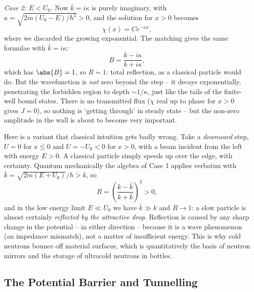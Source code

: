 \emph{Case 2: $E < U_0$.} Now $\bar{k} = i \kappa$ is purely imaginary, with $\kappa = \sqrt{2m(U_0 - E)/\hbar^2} > 0$, and the solution for $x > 0$ becomes
$$
\chi(x) = C e^{-\kappa x},
$$
where we discarded the growing exponential. The matching gives the same formulae with $\bar k = i\kappa$:
$$
B = \frac{k - i \kappa}{k + i \kappa},
$$
which has $\abs{B} = 1$, so $R = 1$: total reflection, as a classical particle would do. But the wavefunction is \emph{not} zero beyond the step -- it decays exponentially, penetrating the forbidden region to depth $\sim 1/\kappa$, just like the tails of the finite-well bound states. There is no transmitted flux ($\chi$ real up to phase for $x>0$ gives $J = 0$), so nothing is `getting through' in steady state -- but the non-zero amplitude in the wall is about to become very important.

\begin{example}
    Here is a variant that classical intuition gets badly wrong. Take a \emph{downward} step, $U = 0$ for $x \leq 0$ and $U = -U_0 < 0$ for $x > 0$, with a beam incident from the left with energy $E > 0$. A classical particle simply speeds up over the edge, with certainty. Quantum mechanically the algebra of Case 1 applies verbatim with $\bar{k} = \sqrt{2m(E + U_0)}/\hbar > k$, so
    $$
    R = \left( \frac{k - \bar{k}}{k + \bar{k}} \right)^2 > 0,
    $$
    and in the low energy limit $E \ll U_0$ we have $\bar{k} \gg k$ and $R \rightarrow 1$: a slow particle is almost certainly \emph{reflected by the attractive drop}. Reflection is caused by any sharp change in the potential -- in either direction -- because it is a wave phenomenon (an impedance mismatch), not a matter of insufficient energy. This is why cold neutrons bounce off material surfaces, which is quantitatively the basis of neutron mirrors and the storage of ultracold neutrons in bottles.
\end{example}

\subsection{The Potential Barrier and Tunnelling}


